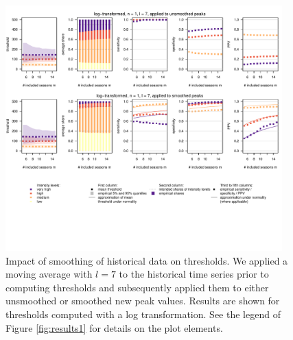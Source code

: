 \documentclass[12pt]{article}
\begin{document}
\begin{figure}[h!]
\includegraphics[width=0.95\textwidth]{figure/plot_smoothing7_fr_small.pdf}
\caption{Impact of smoothing of historical data on thresholds. We applied a moving average with $l = 7$ to the historical time series prior to computing thresholds and subsequently applied them to either unsmoothed or smoothed new peak values. Results are shown for thresholds computed with a log transformation. See the legend of Figure \ref{fig:results1} for details on the plot elements.}
\label{fig:results_smoothing7}
\end{figure}

\newpage
\end{document}
